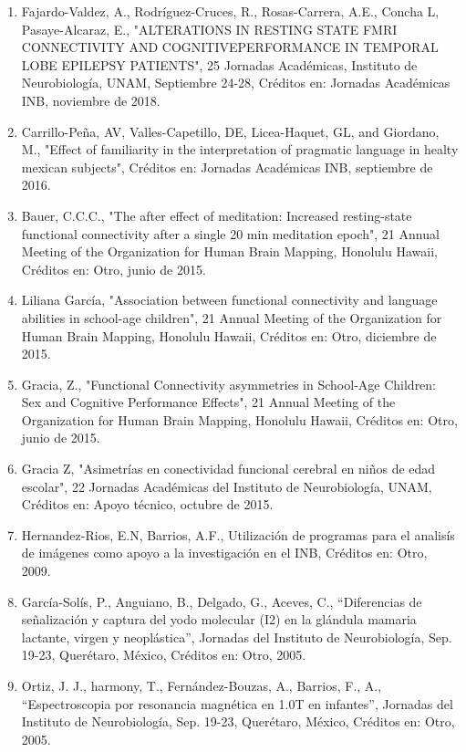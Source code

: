 \begin{enumerate}
\item Fajardo-Valdez, A., Rodríguez-Cruces, R., Rosas-Carrera, A.E., Concha L, Pasaye-Alcaraz, E., "ALTERATIONS IN RESTING 
STATE FMRI CONNECTIVITY AND COGNITIVEPERFORMANCE IN TEMPORAL LOBE EPILEPSY PATIENTS", 25 Jornadas Académicas, Instituto de 
Neurobiología, UNAM, Septiembre 24-28, Créditos en: Jornadas Académicas INB, noviembre de 2018.

\item Carrillo-Peña, AV, Valles-Capetillo, DE, Licea-Haquet, GL, and Giordano, M., "Effect of familiarity in the 
interpretation of pragmatic language in healty mexican subjects", Créditos en: Jornadas Académicas INB, septiembre de 2016.

\item Bauer, C.C.C., "The after effect of meditation: Increased resting-state functional connectivity after a single 20 min 
meditation epoch", 21 Annual Meeting of the Organization for Human Brain Mapping, Honolulu Hawaii, Créditos en: Otro, junio 
de 2015.

\item Liliana García, "Association between functional connectivity and language abilities in school-age children", 21 Annual 
Meeting of the Organization for Human Brain Mapping, Honolulu Hawaii, Créditos en: Otro, diciembre de 2015.

\item Gracia, Z., "Functional Connectivity asymmetries in School-Age Children: Sex and Cognitive Performance Effects", 21 
Annual Meeting of the Organization for Human Brain Mapping, Honolulu Hawaii, Créditos en: Otro, junio de 2015.

\item Gracia Z, "Asimetrías en conectividad funcional cerebral en niños de edad escolar", 22 Jornadas Académicas del 
Instituto de Neurobiología, UNAM, Créditos en: Apoyo técnico, octubre de 2015.

\item Hernandez-Rios, E.N, Barrios, A.F., Utilización de programas para el analisís de imágenes como apoyo a la investigación 
en el INB, Créditos en: Otro, 2009.

\item García-Solís, P., Anguiano, B., Delgado, G., Aceves, C., “Diferencias de señalización y captura del yodo molecular (I2) 
en la glándula mamaria lactante, virgen y neoplástica”, Jornadas del Instituto de Neurobiología, Sep. 19-23, Querétaro, 
México, Créditos en: Otro, 2005.

\item Ortiz, J. J., harmony, T., Fernández-Bouzas, A., Barrios, F., A., “Espectroscopia por resonancia magnética en 1.0T en 
infantes”, Jornadas del Instituto de Neurobiología, Sep. 19-23, Querétaro, México, Créditos en: Otro, 2005.


\end{enumerate}
